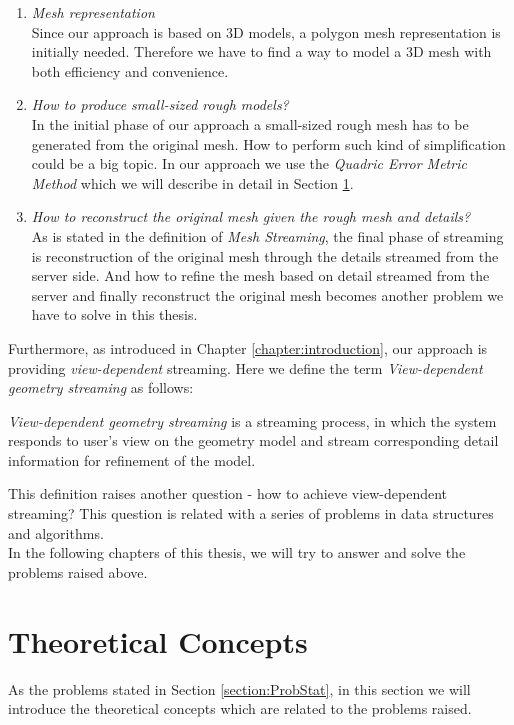 \begin{enumerate}[label=\roman*]
	\item \emph{Mesh representation}\\
	Since our approach is based on 3D models, a polygon mesh representation is initially needed. Therefore we have to find a way to model a 3D mesh with both efficiency and convenience. 
	\item \emph{How to produce small-sized rough models? }\\
	In the initial phase of our approach a small-sized rough mesh has to be generated from the original mesh. How to perform such kind of simplification could be a big topic. In our approach we use the \emph{Quadric Error Metric Method} which we will describe in detail in Section \ref{section:TheoConcpt}. 
	\item \emph{How to reconstruct the original mesh given the rough mesh and details? }\\
	As is stated in the definition of \emph{Mesh Streaming}, the final phase of streaming is reconstruction of the original mesh through the details streamed from the server side. And how to refine the mesh based on detail streamed from the server and finally reconstruct the original mesh becomes another problem we have to solve in this thesis. 
\end{enumerate}

Furthermore, as introduced in Chapter \ref{chapter:introduction}, our approach is providing \emph{view-dependent} streaming. Here we define the term \emph{View-dependent geometry streaming} as follows: 
\begin{defn}
	\emph{View-dependent geometry streaming} is a streaming process, in which the system responds to user's view on the geometry model and stream corresponding detail information for refinement of the model. 
\end{defn}
This definition raises another question - how to achieve view-dependent streaming? This question is related with a series of problems in data structures and algorithms. \\

In the following chapters of this thesis, we will try to answer and solve the problems raised above. 

\section{Theoretical Concepts}
\label{section:TheoConcpt}
As the problems stated in Section \ref{section:ProbStat}, in this section we will introduce the theoretical concepts which are related to the problems raised. 

